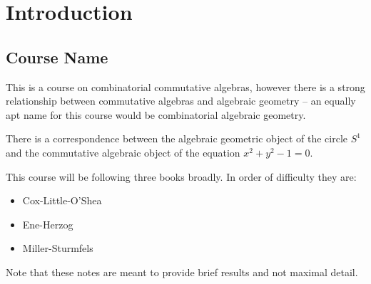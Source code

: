 \newpage
\section{Introduction \label{sec:intro}}
\subsection{Course Name}

This is a course on combinatorial commutative algebras, however there is a strong relationship between commutative algebras and algebraic geometry -- an equally apt name for this course would be combinatorial algebraic geometry.

\begin{example}
There is a correspondence between the algebraic geometric object of the circle $S^1$ and the commutative algebraic object of the equation $x^2 + y^2 - 1 =0$.
\end{example}

This course will be following three books broadly. In order of difficulty they are:
\begin{itemize}
    \item Cox-Little-O'Shea
    \item Ene-Herzog
    \item Miller-Sturmfels
\end{itemize}


Note that these notes are meant to provide brief results and not maximal detail.





